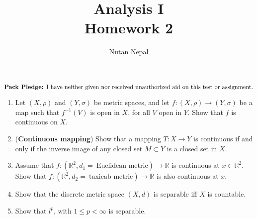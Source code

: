 \documentclass[12pt]{article}
\title{\textbf{Analysis I} \\
\large Homework 2
}
\author{Nutan Nepal}
\newcommand{\mR}{\mathbb{R}}
\newcommand{\packpledge}{
    $\text{{\bf Pack Pledge:} I have neither given nor
    received unauthorized aid on this
    test or assignment.}$}
\begin{document}
\maketitle
\packpledge\\
\makebox[\linewidth]{\rule{200mm}{1pt}}
\vspace{1mm}

\begin{enumerate}

\item Let $(X, \rho)$ and $(Y, \sigma)$ be metric spaces,
    and let $f: (X, \rho) \to (Y, \sigma)$ be a map
    such that $f^{-1}(V)$ is open in $X$, for all
    $V$ open in $Y$. Show that $f$ is continuous on $X$. 

\begin{mybox}

    \vspace*{15mm}
\end{mybox}


\item ({\bf Continuous mapping}) Show that a
    mapping $T: X\to Y$ is continuous
    if and only if the inverse image of any closed
    set $M\subset Y$ is a closed
    set in $X$.
\begin{mybox}

    \vspace*{15mm}
\end{mybox}
 
 
\item Assume that $f : (\mR^2, d_1 =  \
    \text{Euclidean metric}) \to \mR$ is continuous at
    $x \in \mR^2$. Show that
    $f : (\mR^2, d_2 =  \ \text{taxicab metric})
    \to \mR$ is also continuous at $x$.
\begin{mybox}

    \vspace*{15mm}
\end{mybox}

\item Show that the discrete metric space $(X,d)$ is
    separable iff $X$ is countable. 
\begin{mybox}

    \vspace*{15mm}
\end{mybox}
 
\item Show that $l^p$, with $1 \leq p <
    \infty$ is separable.
\begin{mybox}

    \vspace*{15mm}
\end{mybox}
 

\end{enumerate}
\end{document}
